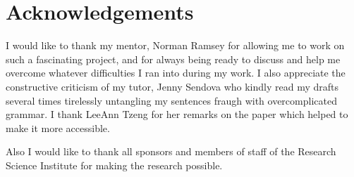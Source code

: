 \section{Acknowledgements}

I would like to thank my mentor, 
{Norman Ramsey}
for allowing me to work on such a fascinating project,
and for always being ready to discuss and help me overcome
whatever difficulties I ran into during my work.
I also appreciate the
constructive criticism of my tutor, {Jenny Sendova} 
who kindly read my drafts
several times tirelessly untangling my 
sentences fraugh with overcomplicated grammar.
I thank {LeeAnn Tzeng} for her remarks
on the paper which helped to make it more accessible.

Also I would like to thank all sponsors and members of staff of the
{Research Science Institute} for making the research possible.
